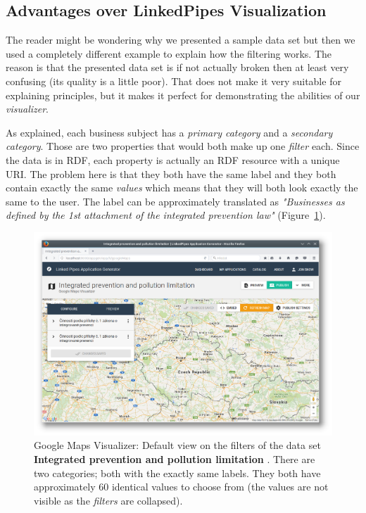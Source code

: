 \subsection{Advantages over LinkedPipes Visualization}
\label{sec:visualizers:google-maps:advantages}

The reader might be wondering why we presented a sample data set but then we used a completely different example to explain how the filtering works. The reason is that the presented data set is if not actually broken then at least very confusing (its quality is a little poor). That does not make it very suitable for explaining principles, but it makes it perfect for demonstrating the abilities of our \emph{visualizer}.

As explained, each business subject has a \emph{primary category} and a \emph{secondary category}. Those are two properties that would both make up one \emph{filter} each. Since the data is in RDF, each property is actually an RDF resource with a unique URI. The problem here is that they both have the same label and they both contain exactly the same \emph{values} which means that they will both look exactly the same to the user. The label can be approximately translated as \textit{"Businesses as defined by the 1st attachment of the integrated prevention law"} (Figure~\ref{fig:map-confusing-filters}).

\begin{figure}
	\centering
	\includegraphics[width=145mm]{img/06_map_confusing_filters}
	\caption{Google Maps Visualizer: Default view on the filters of the data set \textbf{Integrated prevention and pollution limitation} \cite{prevention-and-pollution-limitation}. There are two categories; both with the exactly same labels. They both have approximately 60 identical values to choose from (the values are not visible as the \emph{filters} are collapsed).}
    \label{fig:map-confusing-filters}
\end{figure}

